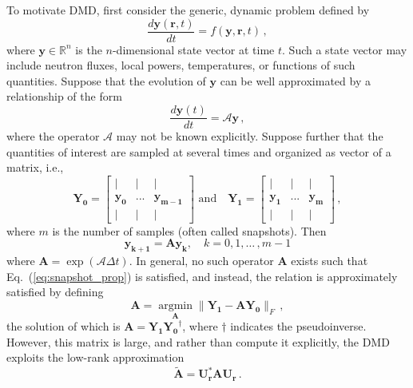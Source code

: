 \documentclass{anstrans}
\renewcommand{\vec}[1]{\bm{#1}} %
\DeclareMathOperator*{\argmin}{argmin}
\begin{document}
To motivate DMD, first consider the generic, dynamic problem defined by
\begin{equation}
  \frac{d{\vec{y} }(\vec{r},t)}{dt}=f(\vec{y},\vec{r},t) \, ,
\end{equation}
where ${\vec{y}} \in \mathbb{R}^{n}$ is the $n$-dimensional state vector at time $t$.  
Such a state vector may include neutron fluxes, local powers, temperatures, or functions of such quantities.
Suppose that the evolution of $\vec{y}$ can be well approximated by a relationship of the form  
\begin{equation}
 \frac{d{\vec{y}}(t)}{dt}=\mathcal{A}\vec{y} \, ,
\end{equation}
where the operator $\mathcal{A}$ may not be known explicitly. 
Suppose further that the quantities of interest are sampled at several times and organized as vector of a matrix, i.e.,
\begin{equation}
\mathbf{Y_0}=\left[\begin{array}{ccc}
| & |   & | \\
{\vec{y_0}} &   ... & {\vec{y_{m-1}}} \\ 
| & | &  | 
\end{array} \right] 
 \,\, \text{and} \quad
{\mathbf{Y_1}}=\left[\begin{array}{ccc}
| & |  & | \\ 
{\vec{y_1}} & ... & {\vec{y_{m}}} \\ 
| & |  & |
\end{array} \right] \, ,
\end{equation}
where $m$ is the number of samples (often called snapshots).  
Then
\begin{equation}
  \mathbf{y_{k+1}}=\mathbf{A}\mathbf{y_{k}}, \quad k = 0, 1, \ldots \, ,m-1
\label{eq:snapshot_prop}
\end{equation}
where $\mathbf{A}=\exp(\mathcal{A}\Delta t)$.  
In general, no such operator $\mathbf{A}$ exists such that Eq.~(\ref{eq:snapshot_prop}) is satisfied, and instead, the relation is approximately satisfied by defining
\begin{equation}
\label{eq:AOpt}
    \mathbf{A}=\argmin\limits_{\mathbf{A}}\|\mathbf{Y_{1}} -\mathbf{AY_{0}}\|_F \, ,
\end{equation}
the solution of which is $\mathbf{A}=\mathbf{Y_1}\mathbf{{{Y}_{0}}^{\dagger}}$, where $\dagger$ indicates the pseudoinverse.
However, this matrix is large, and rather than compute it explicitly, the DMD exploits the low-rank approximation
\begin{equation}
\mathbf{\tilde{A}} = \mathbf{U_r^{*}AU_r} \, .
\end{equation}
\end{document}
